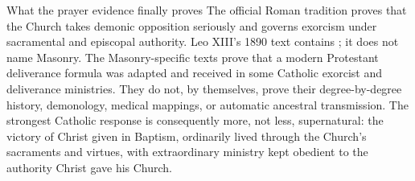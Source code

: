 \begin{studybox}{What the prayer evidence finally proves}
The official Roman tradition proves that the Church takes demonic opposition seriously and governs exorcism under sacramental and episcopal authority.  Leo XIII's 1890 text contains ; it does not name Masonry.  The Masonry-specific texts prove that a modern Protestant deliverance formula was adapted and received in some Catholic exorcist and deliverance ministries.  They do not, by themselves, prove their degree-by-degree history, demonology, medical mappings, or automatic ancestral transmission.  The strongest Catholic response is consequently more, not less, supernatural: the victory of Christ given in Baptism, ordinarily lived through the Church's sacraments and virtues, with extraordinary ministry kept obedient to the authority Christ gave his Church.
\end{studybox}
